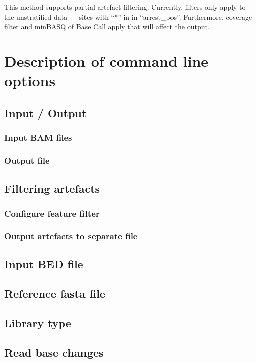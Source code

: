 \documentclass[10pt,a4paper]{article}
\begin{document}
This method supports partial artefact filtering. Currently, filters only apply to the unstratified data --- 
sites with ``*'' in in ``arrest\_pos''. Furthermore, coverage filter and minBASQ of Base Call apply 
that will affect the output.
\section{Description of command line options}
\subsection{Input / Output}
\subsubsection{Input BAM files}
\subsubsection{Output file}

%
\subsection{Filtering artefacts}
\subsubsection{Configure feature filter}

\subsubsection{Output artefacts to separate file}

%
\subsection{Input BED file}

\subsection{Reference fasta file}

%
\subsection{Library type}

%
\subsection{Read base changes}

\end{document}

